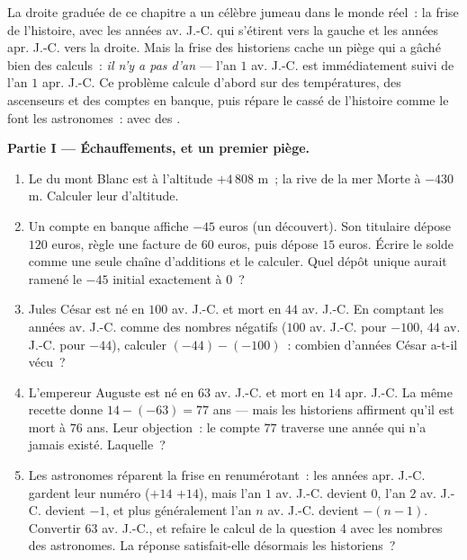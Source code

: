 \begin{problem}
\label{pb:g7:negatives:1}
La droite graduée de ce chapitre a un célèbre jumeau dans le monde
réel~: la frise de l'histoire, avec les années av. J.-C. qui
s'étirent vers la gauche et les années apr. J.-C. vers la droite.
Mais la frise des historiens cache un piège qui a gâché bien des
calculs~: \emph{il n'y a pas d'an } --- l'an $1$ av. J.-C. est
immédiatement suivi de l'an $1$ apr. J.-C. Ce problème calcule
d'abord sur des températures, des ascenseurs et des comptes en
banque, puis répare le  cassé de l'histoire comme le font les
astronomes~: avec des .

\medskip
\noindent\textbf{Partie I --- Échauffements, et un premier piège.}
\begin{enumerate}
  \item Le  du mont Blanc est à l'altitude $+4\,808$ m~; la
        rive de la mer Morte à $-430$ m. Calculer leur 
        d'altitude.
  \item Un compte en banque affiche $-45$ euros (un découvert). Son
        titulaire dépose $120$ euros, règle une facture de $60$
        euros, puis dépose $15$ euros. Écrire le solde comme une
        seule chaîne d'additions et le calculer. Quel dépôt unique
        aurait ramené le $-45$ initial exactement à $0$~?
  \item Jules César est né en $100$ av. J.-C. et mort en $44$
        av. J.-C. En comptant les années av. J.-C. comme des nombres
        négatifs ($100$ av. J.-C. pour $-100$, $44$ av. J.-C. pour
        $-44$), calculer $(-44) - (-100)$~: combien d'années César
        a-t-il vécu~?
  \item L'empereur Auguste est né en $63$ av. J.-C. et mort en $14$
        apr. J.-C. La même recette donne $14 - (-63) = 77$ ans ---
        mais les historiens affirment qu'il est mort à $76$ ans.
        Leur objection~: le compte $77$ traverse une année qui n'a
        jamais existé. Laquelle~?
  \item Les astronomes réparent la frise en renumérotant~: les
        années apr. J.-C. gardent leur numéro ($+14$  $+14$),
        mais l'an $1$ av. J.-C. devient $0$, l'an $2$ av. J.-C.
        devient $-1$, et plus généralement l'an $n$ av. J.-C.
        devient $-(n - 1)$. Convertir $63$ av. J.-C., et refaire le
        calcul de la question 4 avec les nombres des astronomes. La
        réponse satisfait-elle désormais les historiens~?
\end{enumerate}


\end{problem}
